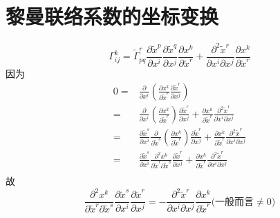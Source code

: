 \documentclass{book}
\begin{document}
    \section{黎曼联络系数的坐标变换}
        \begin{equation*}
            \Gamma_{ij}^{k}=\tilde{\Gamma}_{pq}^{r}\frac{\partial\tilde{x}^p}{\partial x^i}\frac{\partial\tilde{x}^q}{\partial x^j}\frac{\partial x^k}{\partial\tilde{x}^r}+\frac{\partial^2\tilde{x}^r}{\partial x^i \partial x^j}\frac{\partial x^k}{\partial\tilde{x}^r}
        \end{equation*}
        因为
        \begin{align*}
            0 =& \frac{\partial}{\partial x^i}\left(\frac{\partial x^k}{\partial\tilde{x}^r}\frac{\partial\tilde{x}^r}{\partial x^j}\right) \\
            =& \frac{\partial}{\partial x^i}\left(\frac{\partial x^k}{\partial\tilde{x}^r}\right)\frac{\partial\tilde{x}^r}{\partial x^j} + \frac{\partial x^k}{\partial\tilde{x}^r}\frac{\partial^2\tilde{x}^r}{\partial x^i\partial x^j} \\
            =& \frac{\partial\tilde{x}^s}{\partial x^i}\frac{\partial}{\partial\tilde{x}^s}\left(\frac{\partial x^k}{\partial\tilde{x}^r}\right)\frac{\partial\tilde{x}^r}{\partial x^j} + \frac{\partial x^k}{\partial\tilde{x}^r}\frac{\partial^2\tilde{x}^r}{\partial x^i\partial x^j} \\
            =& \frac{\partial\tilde{x}^s}{\partial x^i}\frac{\partial^2 x^k}{\partial\tilde{x}^r\partial\tilde{x}^s}\frac{\partial\tilde{x}^r}{\partial x^j} + \frac{\partial x^k}{\partial\tilde{x}^r}\frac{\partial^2\tilde{x}^r}{\partial x^i\partial x^j} \\
        \end{align*}
        故
        \begin{equation*}
            \frac{\partial^2 x^k}{\partial\tilde{x}^r\partial\tilde{x}^s}\frac{\partial\tilde{x}^s}{\partial x^i}\frac{\partial\tilde{x}^r}{\partial x^j} = -\frac{\partial^2\tilde{x}^r}{\partial x^i\partial x^j}\frac{\partial x^k}{\partial\tilde{x}^r}\Big(\text{一般而言}\neq0\Big)
        \end{equation*}
\end{document}
